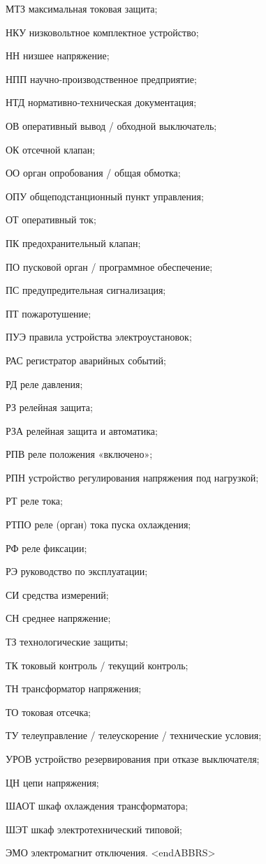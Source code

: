 \begin{list}{}
\item[МТЗ] максимальная токовая защита;
\item[НКУ] низковольтное комплектное устройство;
\item[НН] низшее напряжение;
\item[НПП] научно-производственное предприятие;
\item[НТД] нормативно-техническая документация;
\item[ОВ] оперативный вывод / обходной выключатель;
\item[ОК] отсечной клапан;
\item[ОО] орган опробования / общая обмотка;
\item[ОПУ] общеподстанционный пункт управления;
\item[ОТ] оперативный ток;
\item[ПК] предохранительный клапан;
\item[ПО] пусковой орган / программное обеспечение;
\item[ПС] предупредительная сигнализация;
\item[ПТ] пожаротушение;
\item[ПУЭ] правила устройства электроустановок;
\item[РАС] регистратор аварийных событий;
\item[РД] реле давления;
\item[РЗ] релейная защита;
\item[РЗА] релейная защита и автоматика;
\item[РПВ] реле положения «включено»;
\item[РПН] устройство регулирования напряжения под нагрузкой;
\item[РТ] реле тока;
\item[РТПО] реле (орган) тока пуска охлаждения;
\item[РФ] реле фиксации;
\item[РЭ] руководство по эксплуатации;
\item[СИ] средства измерений;
\item[СН] среднее напряжение;
\item[ТЗ] технологические защиты;
\item[ТК] токовый контроль / текущий контроль;
\item[ТН] трансформатор напряжения;
\item[ТО] токовая отсечка;
\item[ТУ] телеуправление / телеускорение / технические условия;
\item[УРОВ] устройство резервирования при отказе выключателя;
\item[ЦН] цепи напряжения;
\item[ШАОТ] шкаф охлаждения трансформатора;
\item[ШЭТ] шкаф электротехнический типовой;
\item[ЭМО] электромагнит отключения.
{\color{white}\fontsize{0.1pt}{0.1pt}\selectfont<endABBRS>}
\end{list}
